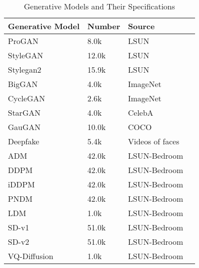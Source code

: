 \begin{table}[ht]
\centering
\caption{Generative Models and Their Specifications}
\label{table_generative_models}
\begin{tabular}{|l|l|l|l|}
\hline
\textbf{Generative Model} & \textbf{Number} & \textbf{Source} \\ \hline
ProGAN & 8.0k & LSUN \\ 
StyleGAN  & 12.0k & LSUN \\
Stylegan2 & 15.9k & LSUN \\ 
BigGAN & 4.0k & ImageNet \\ 
CycleGAN & 2.6k & ImageNet \\ 
StarGAN & 4.0k & CelebA \\ 
GauGAN & 10.0k & COCO \\ 
Deepfake & 5.4k & Videos of faces \\ 
\hdashline
ADM & 42.0k & LSUN-Bedroom \\ 
DDPM & 42.0k & LSUN-Bedroom \\ 
iDDPM & 42.0k & LSUN-Bedroom \\ 
PNDM & 42.0k & LSUN-Bedroom \\ 
LDM & 1.0k & LSUN-Bedroom \\ 
SD-v1 & 51.0k & LSUN-Bedroom \\ 
SD-v2 & 51.0k & LSUN-Bedroom \\ 
VQ-Diffusion & 1.0k & LSUN-Bedroom \\ 
\hline

\end{tabular}
\end{table}
